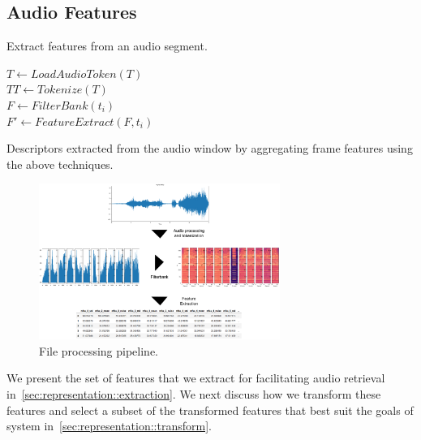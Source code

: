 \subsection{Audio Features}

\begin{algorithm}[t]
    \caption{Extract features from an audio segment.}
    \label{alg:encoder}
    \SetAlgoLined
        
     {
        $T \gets LoadAudioToken(T)$\\
        $TT \gets Tokenize(T)$\\
         {
            $F \gets FilterBank(t_i)$ \\
            $F' \gets FeatureExtract(F, t_i)$
        }
    }
\end{algorithm}

\begin{table}[t!]
\centering

\caption{
 Descriptors extracted from the audio window by
 aggregating frame features using the above techniques. }
\label{tab:stats}
\end{table}

\begin{figure}[t]
    \centering
    \includegraphics[width=0.7\textwidth]{figures/processing-pipeline.png}
    \caption{File processing pipeline.}
    \label{fig:my-label}
\end{figure}

We present the set of features that we extract for facilitating audio retrieval
in~\cref{sec:representation::extraction}.
%
We next discuss how we transform these features and select a subset of the
transformed features that best suit the goals of system
in~\cref{sec:representation::transform}.

